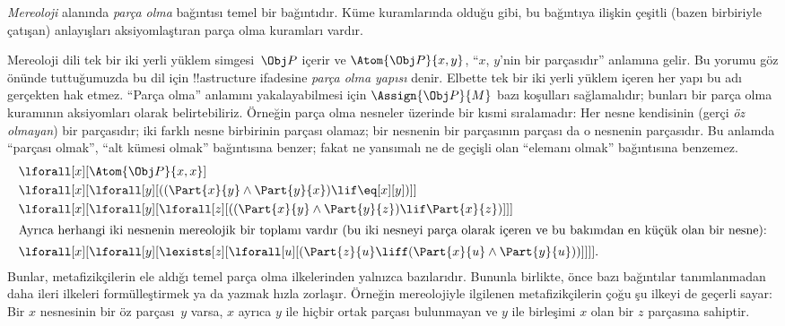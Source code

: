 \begin{ex}
\emph{Mereoloji} alanında \emph{parça olma} bağıntısı temel bir
bağıntıdır. Küme kuramlarında olduğu gibi, bu bağıntıya ilişkin çeşitli
(bazen birbiriyle çatışan) anlayışları aksiyomlaştıran parça olma
kuramları vardır.

Mereoloji dili tek bir iki yerli yüklem simgesi~$\Obj P$ içerir ve
$\Atom{\Obj P}{x,y}$, ``$x$, $y$'nin bir parçasıdır'' anlamına gelir.
Bu yorumu göz önünde tuttuğumuzda bu dil için !!a{structure}
ifadesine \emph{parça olma yapısı} denir. Elbette tek bir iki yerli
yüklem içeren her yapı bu adı gerçekten hak etmez. ``Parça olma''
anlamını yakalayabilmesi için $\Assign{\Obj P}{M}$ bazı koşulları
sağlamalıdır; bunları bir parça olma kuramının aksiyomları olarak
belirtebiliriz. Örneğin parça olma nesneler üzerinde bir kısmi
sıralamadır: Her nesne kendisinin (gerçi \emph{öz olmayan}) bir
parçasıdır; iki farklı nesne birbirinin parçası olamaz; bir nesnenin
bir parçasının parçası da o nesnenin parçasıdır. Bu anlamda ``parçası
olmak'', ``alt kümesi olmak'' bağıntısına benzer; fakat ne yansımalı ne
de geçişli olan ``elemanı olmak'' bağıntısına benzemez.
\begin{align*}
& \lforall[x][\Atom{\Obj P}{x,x}] \\
& \lforall[x][\lforall[y][((\Part{x}{y} \land \Part{y}{x})
      \lif \eq[x][y])]] \\
& \lforall[x][\lforall[y][\lforall[z][((\Part{x}{y} \land
        \Part{y}{z}) \lif \Part{x}{z})]]]\\
\intertext{Ayrıca herhangi iki nesnenin mereolojik bir toplamı vardır
(bu iki nesneyi parça olarak içeren ve bu bakımdan en küçük olan bir nesne):} &
\lforall[x][\lforall[y][\lexists[z][\lforall[u][(\Part{z}{u} \liff
        (\Part{x}{u} \land \Part{y}{u}))]]]].
\end{align*}
Bunlar, metafizikçilerin ele aldığı temel parça olma ilkelerinden
yalnızca bazılarıdır. Bununla birlikte, önce bazı bağıntılar
tanımlanmadan daha ileri ilkeleri formülleştirmek ya da yazmak hızla
zorlaşır. Örneğin mereolojiyle ilgilenen metafizikçilerin çoğu şu
ilkeyi de geçerli sayar: Bir $x$ nesnesinin bir öz parçası~$y$ varsa,
$x$ ayrıca $y$ ile hiçbir ortak parçası bulunmayan ve $y$ ile
birleşimi $x$ olan bir $z$ parçasına sahiptir.
\end{ex}


